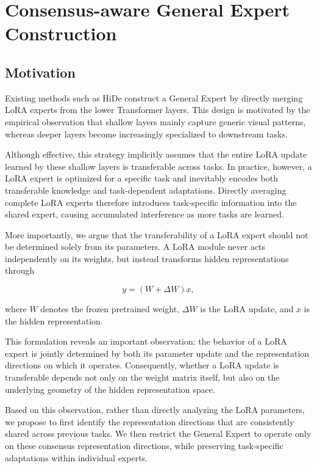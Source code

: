 \documentclass[a4paper]{article}
\begin{document}
\section{Consensus-aware General Expert Construction}

\subsection{Motivation}

Existing methods such as HiDe construct a General Expert by directly merging LoRA experts from the lower Transformer layers. This design is motivated by the empirical observation that shallow layers mainly capture generic visual patterns, whereas deeper layers become increasingly specialized to downstream tasks.

Although effective, this strategy implicitly assumes that the entire LoRA update learned by these shallow layers is transferable across tasks. In practice, however, a LoRA expert is optimized for a specific task and inevitably encodes both transferable knowledge and task-dependent adaptations. Directly averaging complete LoRA experts therefore introduces task-specific information into the shared expert, causing accumulated interference as more tasks are learned.

More importantly, we argue that the transferability of a LoRA expert should not be determined solely from its parameters. A LoRA module never acts independently on its weights, but instead transforms hidden representations through

\begin{equation}
y=(W+\Delta W)x,
\end{equation}

where $W$ denotes the frozen pretrained weight, $\Delta W$ is the LoRA update, and $x$ is the hidden representation.

This formulation reveals an important observation: the behavior of a LoRA expert is jointly determined by both its parameter update and the representation directions on which it operates. Consequently, whether a LoRA update is transferable depends not only on the weight matrix itself, but also on the underlying geometry of the hidden representation space.

Based on this observation, rather than directly analyzing the LoRA parameters, we propose to first identify the representation directions that are consistently shared across previous tasks. We then restrict the General Expert to operate only on these consensus representation directions, while preserving task-specific adaptations within individual experts.
\end{document}
